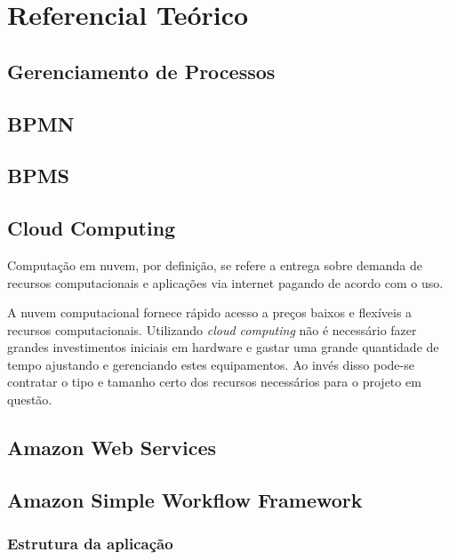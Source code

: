 \chapter{Referencial Teórico}

\section{Gerenciamento de Processos}

\section{BPMN}

\section{BPMS}

\section{Cloud Computing}

Computação em nuvem, por definição, se refere a entrega sobre demanda de recursos computacionais e aplicações via internet pagando de acordo com o uso.

A nuvem computacional fornece rápido acesso a preços baixos e flexíveis a recursos computacionais. Utilizando \textit{cloud computing} não é necessário fazer grandes investimentos iniciais em hardware e gastar uma grande quantidade de tempo ajustando e gerenciando estes equipamentos. Ao invés disso pode-se contratar o tipo e tamanho certo dos recursos necessários para o projeto em questão.


\section{Amazon Web Services}

\section{Amazon Simple Workflow Framework}

\subsection{Estrutura da aplicação}

